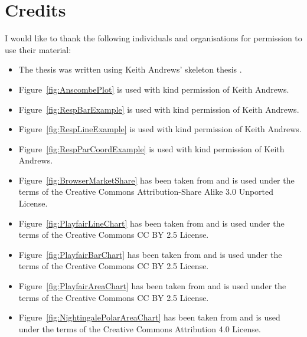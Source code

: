 \chapter*{Credits}

I would like to thank the following individuals and organisations for
permission to use their material:
\begin{itemize}
\item The thesis was written using Keith Andrews' skeleton thesis
  \parencite{KeithThesis}.

  \item Figure~\ref{fig:AnscombePlot} is used with kind permission of
    Keith Andrews.

  \item Figure~\ref{fig:RespBarExample} is used with kind permission of
  Keith Andrews.

  \item Figure~\ref{fig:RespLineExample} is used with kind permission
  of Keith Andrews.

  \item Figure~\ref{fig:RespParCoordExample} is used with kind permission
  of Keith Andrews.

  \item Figure~\ref{fig:BrowserMarketShare} has been taken from
  \textcite{BrowserMarketShare} and is used under the terms of the
  Creative Commons Attribution-Share Alike 3.0 Unported License.

  \item Figure~\ref{fig:PlayfairLineChart} has been taken from
  \textcite{SCETI} and is used under the terms of the
  Creative Commons CC BY 2.5 License.

  \item Figure~\ref{fig:PlayfairBarChart} has been taken from
  \textcite{SCETI} and is used under the terms of the
  Creative Commons CC BY 2.5 License.

  \item Figure~\ref{fig:PlayfairAreaChart} has been taken from
  \textcite{SCETI} and is used under the terms of the
  Creative Commons CC BY 2.5 License.

  \item Figure~\ref{fig:NightingalePolarAreaChart} has been taken from
  \textcite{HarvardLibrary} and is used under the terms of the
  Creative Commons Attribution 4.0 License.

\end{itemize}



